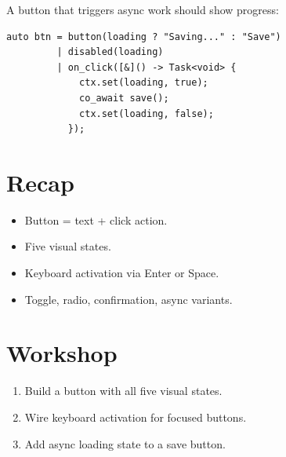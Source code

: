 A button that triggers async work should show progress:

\begin{lstlisting}
auto btn = button(loading ? "Saving..." : "Save")
         | disabled(loading)
         | on_click([&]() -> Task<void> {
             ctx.set(loading, true);
             co_await save();
             ctx.set(loading, false);
           });
\end{lstlisting}

\section{Recap}

\begin{recap}
\begin{itemize}[leftmargin=*]
  \item Button = text + click action.
  \item Five visual states.
  \item Keyboard activation via Enter or Space.
  \item Toggle, radio, confirmation, async variants.
\end{itemize}
\end{recap}

\section*{Workshop}

\begin{enumerate}[leftmargin=*]
  \item Build a button with all five visual states.
  \item Wire keyboard activation for focused buttons.
  \item Add async loading state to a save button.
\end{enumerate}

